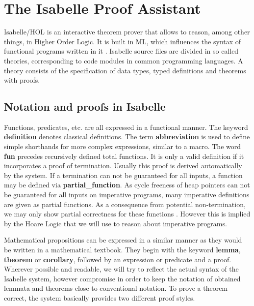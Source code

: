 


\section{The Isabelle Proof Assistant}

Isabelle/HOL is an interactive theorem prover that allows
to reason, among other things,
in Higher Order Logic.
It is built in ML, which influences the syntax of functional
programs written in it \parencite{DBLP:books/sp/NipkowPW02}.
Isabelle source files are divided in so called theories,
corresponding to code modules in common programming languages.
A theory consists of the specification of data types,
typed definitions and theorems with proofs.

\subsection{Notation and proofs in Isabelle}

Functions, predicates, etc. are all expressed in
a functional manner.
The keyword \textbf{definition} denotes classical definitions.
The term \textbf{abbreviation} is used to define simple shorthands for more complex expressions,
similar to a macro.
The word \textbf{fun} precedes recursively defined total functions.
It is only a valid definition if it incorporates a proof of termination.
Usually this proof is derived automatically by the system.
If a termination can not be guaranteed for all inputs,
a function may be defined via \textbf{partial\_function}.
As cycle freeness of heap pointers can not be guaranteed for all inputs
on imperative programs, many imperative definitions are given
as partial functions.
As a consequence from potential non-termination,
we may only show partial correctness for these functions \parencite{DBLP:conf/itp/Krauss10}.
However this is implied by the Hoare Logic that we will use to reason about imperative programs.

Mathematical propositions can be expressed in a similar manner
as they would be written in a mathematical textbook.
They begin with the keyword \textbf{lemma}, \textbf{theorem} or \textbf{corollary},
followed by an expression or predicate and a proof.
Wherever possible and readable, we will try to reflect the actual
syntax of the Isabelle system, however compromise in order to
keep the notation of obtained lemmata and theorems
close to conventional notation.
To prove a theorem correct, the system basically provides two different
proof styles.

